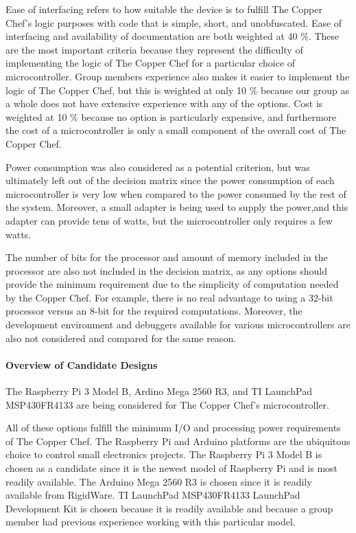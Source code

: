 \documentclass[11pt]{article}
\newcommand{\subsubsubsection}[1]{\paragraph{#1}\mbox{}}
\begin{document}
Ease of interfacing refers to how suitable the device is to fulfill The Copper Chef’s logic purposes with code that is simple, short, and unobfuscated.
Ease of interfacing and availability of documentation are both weighted at 40 \%.
These are the most important criteria because they represent the difficulty of implementing the logic of The Copper Chef for a particular choice of microcontroller.
Group members experience also makes it easier to implement the logic of The Copper Chef, but this is weighted at only 10 \% because our group as a whole does not have extensive experience with any of the options.
Cost is weighted at 10 \% because no option is particularly expensive, and furthermore the cost of a microcontroller is only a small component of the overall cost of The Copper Chef.

Power consumption was also considered as a potential criterion, but was ultimately left out of the decision matrix since the power consumption of each microcontroller is very low when compared to the power consumed by the rest of the system.
Moreover, a small adapter is being used to supply the power,and this adapter can provide tens of watts, but the microcontroller only requires a few watts.

The number of bits for the processor and amount of memory included in the processor are also not included in the decision matrix, as any options should provide the minimum requirement due to the simplicity of computation needed by the Copper Chef.
 For example, there is no real advantage to using a 32-bit processor versus an 8-bit for the required computations.
Moreover, the development environment and debuggers available for various microcontrollers are also not considered and compared for the same reason.

\subsubsubsection{Overview of Candidate Designs}

\noindent
The Raspberry Pi 3 Model B, Ardino Mega 2560 R3, and TI LaunchPad MSP430FR4133 are being considered for The Copper Chef's microcontroller.

All of these options fulfill the minimum I/O and processing power requirements of The Copper Chef.
The Raspberry Pi and Arduino platforms are the ubiquitous choice to control small electronics projects.
The Raspberry Pi 3 Model B is chosen as a candidate since it is the newest model of Raspberry Pi and is most readily available.
The Arduino Mega 2560 R3 is chosen since it is readily available from RigidWare.
TI LaunchPad MSP430FR4133 LaunchPad Development Kit is chosen because it is readily available and because a group member had previous experience working with this particular model.
\end{document}
